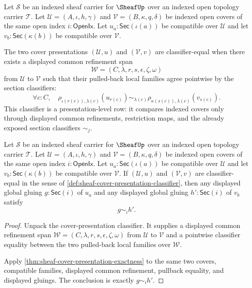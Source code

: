 \begin{definition}
\label{def:sheaf-cover-presentation-classifier}
Let $\mathcal{S}$ be an indexed sheaf carrier for $\SheafUp$ over an indexed open topology carrier $\mathcal{T}$. Let $\mathcal{U}=(A,\iota,h,\gamma)$ and $\mathcal{V}=(B,\kappa,q,\delta)$ be indexed open covers of the same open index $i:\mathsf{OpenIx}$. Let $u_a:\mathsf{Sec}(\iota(a))$ be compatible over $\mathcal{U}$ and let $v_b:\mathsf{Sec}(\kappa(b))$ be compatible over $\mathcal{V}$.

The two cover presentations $(\mathcal{U},u)$ and $(\mathcal{V},v)$ are classifier-equal when there exists a displayed common refinement span
$$
\mathcal{W}=(C,\lambda,r,s,\epsilon,\zeta,\omega)
$$
from $\mathcal{U}$ to $\mathcal{V}$ such that their pulled-back local families agree pointwise by the section classifiers:
$$
\forall c:C,\quad
\rho_{\iota(r(c)),\lambda(c)}(u_{r(c)})
\sim_{\lambda(c)}
\rho_{\kappa(s(c)),\lambda(c)}(v_{s(c)}).
$$
This classifier is a presentation-level row: it compares indexed covers only through displayed common refinements, restriction maps, and the already exposed section classifiers $\sim_j$.
\end{definition}

\begin{theorem}
\label{thm:sheaf-cover-presentation-classifier-soundness}
Let $\mathcal{S}$ be an indexed sheaf carrier for $\SheafUp$ over an indexed open topology carrier $\mathcal{T}$. Let $\mathcal{U}=(A,\iota,h,\gamma)$ and $\mathcal{V}=(B,\kappa,q,\delta)$ be indexed open covers of the same open index $i:\mathsf{OpenIx}$. Let $u_a:\mathsf{Sec}(\iota(a))$ be compatible over $\mathcal{U}$ and let $v_b:\mathsf{Sec}(\kappa(b))$ be compatible over $\mathcal{V}$. If $(\mathcal{U},u)$ and $(\mathcal{V},v)$ are classifier-equal in the sense of \autoref{def:sheaf-cover-presentation-classifier}, then any displayed global gluing $g:\mathsf{Sec}(i)$ of $u_a$ and any displayed global gluing $h':\mathsf{Sec}(i)$ of $v_b$ satisfy
$$
g\sim_i h'.
$$
\end{theorem}
\begin{proof}
Unpack the cover-presentation classifier. It supplies a displayed common refinement span $\mathcal{W}=(C,\lambda,r,s,\epsilon,\zeta,\omega)$ from $\mathcal{U}$ to $\mathcal{V}$ and a pointwise classifier equality between the two pulled-back local families over $\mathcal{W}$.

Apply \autoref{thm:sheaf-cover-presentation-exactness} to the same two covers, compatible families, displayed common refinement, pullback equality, and displayed gluings. The conclusion is exactly $g\sim_i h'$.
\end{proof}

